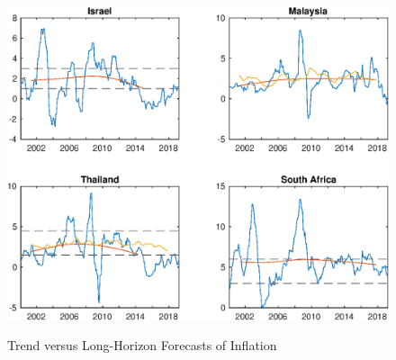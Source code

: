 \documentclass{article}
\begin{document}
\begin{figure}[tbph]
	\begin{center}
		\caption{Trend versus Long-Horizon Forecasts of Inflation}
		\label{fig:CPI_ILSZAR}
		\includegraphics[trim={0cm 0cm 0cm 0cm},clip,height=1\textheight,width=1.4\textwidth]{../Figures/Surveys/CPI_ILSZAR.eps} \\
	\end{center}
\end{figure}
\end{document}
